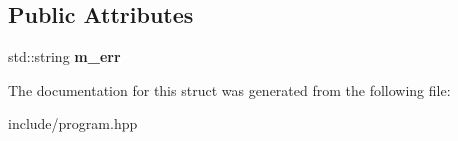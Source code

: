 \subsection*{Public Attributes}
\begin{DoxyCompactItemize}
\item 
\hypertarget{structogls_1_1ProgramException_a36b3b578a699351c7c926f24b1412e98}{std\-::string {\bfseries m\-\_\-err}}\label{structogls_1_1ProgramException_a36b3b578a699351c7c926f24b1412e98}

\end{DoxyCompactItemize}


The documentation for this struct was generated from the following file\-:\begin{DoxyCompactItemize}
\item 
include/program.\-hpp\end{DoxyCompactItemize}
